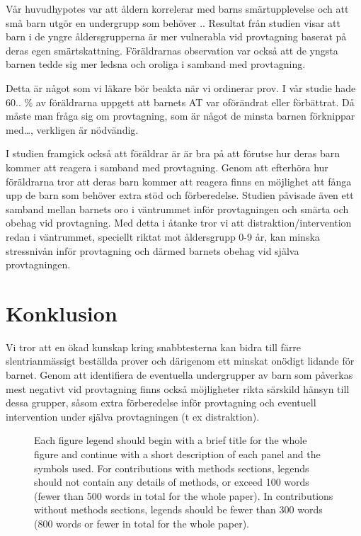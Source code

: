\documentclass{nature}
\begin{document}
V\r{a}r huvudhypotes var att \r{a}ldern korrelerar med barns sm\"artupplevelse och att sm\r{a}
barn utg\"or en undergrupp som beh\"over ..  Resultat fr\r{a}n studien visar att barn i
de yngre \r{a}ldersgrupperna \"ar mer vulnerabla vid provtagning baserat p\r{a} deras egen
sm\"artskattning. F\"or\"aldrarnas observation var ocks\r{a} att de yngsta barnen tedde
sig mer ledsna och oroliga i samband med provtagning.

Detta \"ar n\r{a}got som vi l\"akare b\"or beakta n\"ar vi ordinerar prov. I v\r{a}r studie hade
60.. \% av f\"or\"aldrarna uppgett att barnets AT var of\"or\"andrat eller f\"orb\"attrat.
D\r{a} m\r{a}ste man fr\r{a}ga sig om provtagning, som \"ar n\r{a}got de minsta barnen
f\"orknippar med…, verkligen \"ar n\"odv\"andig.

I studien framgick ocks\r{a} att f\"or\"aldrar \"ar \"ar bra p\r{a} att f\"orutse hur deras barn
kommer att reagera i samband med provtagning. Genom att efterh\"ora hur
f\"or\"aldrarna tror att deras barn kommer att  reagera finns en m\"ojlighet att f\r{a}nga
upp de barn som beh\"over extra st\"od och f\"orberedelse. Studien p\r{a}visade \"aven ett
samband mellan barnets oro i v\"antrummet inf\"or provtagningen och sm\"arta och
obehag vid provtagning. Med detta i \r{a}tanke tror vi att distraktion/intervention
redan i v\"antrummet, speciellt riktat mot \r{a}ldersgrupp 0-9 \r{a}r, kan minska
stressniv\r{a}n inf\"or provtagning och d\"armed barnets obehag vid sj\"alva
provtagningen.

\section{Konklusion}

Vi tror att en \"okad kunskap kring snabbtesterna kan bidra till f\"arre
slentrianm\"assigt best\"allda prover och d\"arigenom ett minskat on\"odigt lidande f\"or
barnet. Genom att identifiera de eventuella undergrupper av barn som p\r{a}verkas
mest negativt vid provtagning finns ocks\r{a} m\"ojligheter rikta s\"arskild h\"ansyn till
dessa grupper, s\r{a}som extra f\"orberedelse inf\"or provtagning och eventuell
intervention under sj\"alva provtagningen (t ex distraktion).


\begin{figure}
\caption{Each figure legend should begin with a brief title for
the whole figure and continue with a short description of each
panel and the symbols used. For contributions with methods
sections, legends should not contain any details of methods, or
exceed 100 words (fewer than 500 words in total for the whole
paper). In contributions without methods sections, legends should
be fewer than 300 words (800 words or fewer in total for the whole
paper).}
\end{figure}
\end{document}
